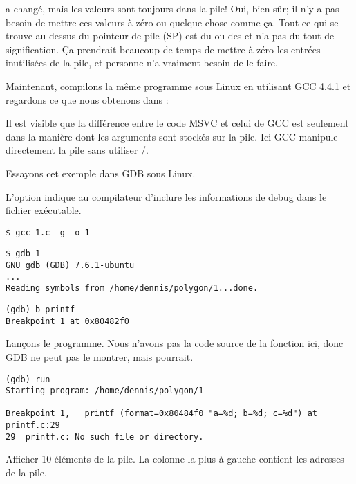 \ESP a changé, mais les valeurs sont toujours dans la pile!
Oui, bien sûr; il n'y a pas besoin de mettre ces valeurs à zéro ou quelque chose
comme ça.
Tout ce qui se trouve au dessus du pointeur de pile (\ac{SP}) est du 
ou des  et n'a pas du tout de signification.
Ça prendrait beaucoup de temps de mettre à zéro les entrées inutilisées de la
pile, et personne n'a vraiment besoin de le faire.


Maintenant, compilons la même programme sous Linux en utilisant GCC 4.4.1 et regardons
ce que nous obtenons dans \IDA:



Il est visible que la différence entre le code MSVC et celui de GCC est seulement
dans la manière dont les arguments sont stockés sur la pile.
Ici GCC manipule directement la pile sans utiliser \PUSH/\POP.


Essayons cet exemple dans \ac{GDB} sous Linux.

L'option  indique au compilateur d'inclure les informations de debug dans
le fichier exécutable.

\begin{lstlisting}
$ gcc 1.c -g -o 1
\end{lstlisting}

\begin{lstlisting}
$ gdb 1
GNU gdb (GDB) 7.6.1-ubuntu
...
Reading symbols from /home/dennis/polygon/1...done.
\end{lstlisting}

\begin{lstlisting}[caption=let's set breakpoint on \printf]
(gdb) b printf
Breakpoint 1 at 0x80482f0
\end{lstlisting}

Lançons le programme.
Nous n'avons pas la code source de la fonction \printf ici, donc \ac{GDB} ne peut
pas le montrer, mais pourrait.

\begin{lstlisting}
(gdb) run
Starting program: /home/dennis/polygon/1

Breakpoint 1, __printf (format=0x80484f0 "a=%d; b=%d; c=%d") at printf.c:29
29	printf.c: No such file or directory.
\end{lstlisting}

Afficher 10 éléments de la pile. La colonne la plus à gauche contient les adresses
de la pile.

